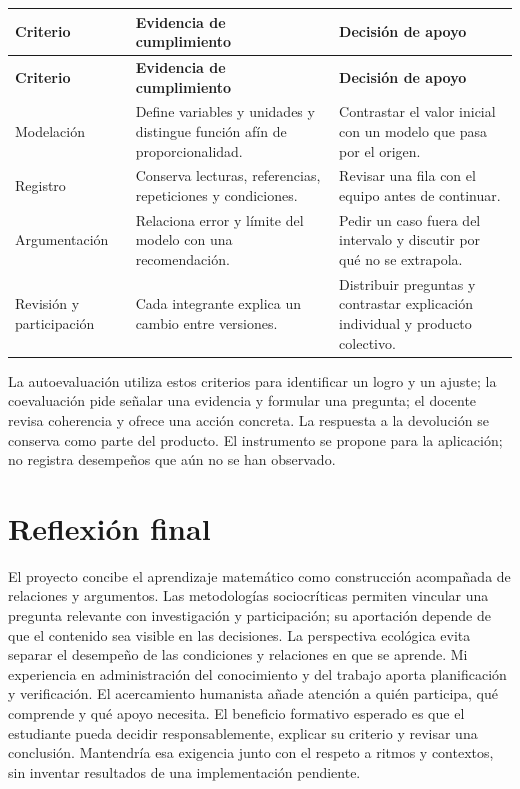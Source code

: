 \documentclass[spanish,letterpaper,oneside]{article}
\begin{document}
{\small{}\renewcommand{\arraystretch}{1.25}
\begin{longtable}{|>{\raggedright\arraybackslash}p{}|>{\raggedright\arraybackslash}p{}|>{\raggedright\arraybackslash}p{}|}\hline
\rowcolor{iiiepePale} \textbf{Criterio} & \textbf{Evidencia de cumplimiento} & \textbf{Decisión de apoyo} \\\hline
\endfirsthead
\hline
\rowcolor{iiiepePale} \textbf{Criterio} & \textbf{Evidencia de cumplimiento} & \textbf{Decisión de apoyo} \\\hline
\endhead
Modelación & Define variables y unidades y distingue función afín de proporcionalidad. & Contrastar el valor inicial con un modelo que pasa por el origen. \\\hline
Registro & Conserva lecturas, referencias, repeticiones y condiciones. & Revisar una fila con el equipo antes de continuar. \\\hline
Argumentación & Relaciona error y límite del modelo con una recomendación. & Pedir un caso fuera del intervalo y discutir por qué no se extrapola. \\\hline
Revisión y participación & Cada integrante explica un cambio entre versiones. & Distribuir preguntas y contrastar explicación individual y producto colectivo. \\\hline
\end{longtable}}
La autoevaluación utiliza estos criterios para identificar un logro y un ajuste; la coevaluación pide señalar una evidencia y formular una pregunta; el docente revisa coherencia y ofrece una acción concreta. La respuesta a la devolución se conserva como parte del producto. El instrumento se propone para la aplicación; no registra desempeños que aún no se han observado.

\section{Reflexión final}
El proyecto concibe el aprendizaje matemático como construcción acompañada de relaciones y argumentos. Las metodologías sociocríticas permiten vincular una pregunta relevante con investigación y participación; su aportación depende de que el contenido sea visible en las decisiones. La perspectiva ecológica evita separar el desempeño de las condiciones y relaciones en que se aprende.
Mi experiencia en administración del conocimiento y del trabajo aporta planificación y verificación. El acercamiento humanista añade atención a quién participa, qué comprende y qué apoyo necesita. El beneficio formativo esperado es que el estudiante pueda decidir responsablemente, explicar su criterio y revisar una conclusión. Mantendría esa exigencia junto con el respeto a ritmos y contextos, sin inventar resultados de una implementación pendiente.
\end{document}
